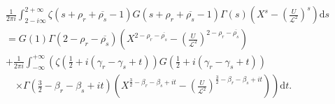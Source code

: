 \documentclass[reqno]{amsart}
\numberwithin{equation}{section}
\theoremstyle{remark}
\begin{document}
\begin{equation}\label{afterresidueth}
    \begin{aligned}
          &\frac{1}{2\pi i}\int_{2-i\infty}^{2+\infty}\zeta\left(s+\rho_{r}+\overline{\rho_s}-1\right)G\left(s+\rho_r+\overline{\rho_s}-1\right)\Gamma(s)\left(X^s-\left(\frac{U}{\mathcal{L}^2}\right)^s\right)\text{d}s\\&=G(1)\Gamma\left(2-\rho_r-\overline{\rho_s}\right)\left(X^{2-\rho_r-\overline{\rho_s}}-\left(\frac{U}{\mathcal{L}^2}\right)^{2-\rho_r-\overline{\rho_s}}\right)\\&+\frac{1}{2\pi i}\int_{-\infty}^{+\infty}\left(\zeta\left(\frac{1}{2}+i(\gamma_r-\gamma_s+t)\right)G\left(\frac{1}{2}+i(\gamma_r-\gamma_s+t)\right)\right.\\&\quad\left.\times \Gamma\left(\frac{3}{2}-\beta_r-\beta_s+it\right)\left(X^{\frac{3}{2}-\beta_r-\beta_s+it}-\left(\frac{U}{\mathcal{L}^2}\right)^{\frac{3}{2}-\beta_r-\beta_s+it}\right)\right)\text{d}t.
    \end{aligned}
\end{equation} 
\end{document}
